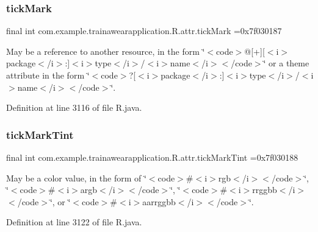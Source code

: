 \subsubsection{\texorpdfstring{tickMark}{tickMark}}
{\footnotesize\ttfamily final int com.\+example.\+trainawearapplication.\+R.\+attr.\+tick\+Mark =0x7f030187\hspace{0.3cm}{\ttfamily [static]}}

May be a reference to another resource, in the form \char`\"{}$<$code$>$@\mbox{[}+\mbox{]}\mbox{[}$<$i$>$package$<$/i$>$\+:\mbox{]}$<$i$>$type$<$/i$>$/$<$i$>$name$<$/i$>$$<$/code$>$\char`\"{} or a theme attribute in the form \char`\"{}$<$code$>$?\mbox{[}$<$i$>$package$<$/i$>$\+:\mbox{]}$<$i$>$type$<$/i$>$/$<$i$>$name$<$/i$>$$<$/code$>$\char`\"{}. 

Definition at line 3116 of file R.\+java.

\mbox{\label{classcom_1_1example_1_1trainawearapplication_1_1_r_1_1attr_a91a05f3697af6e693ff8680b084b4ada}} 
\subsubsection{\texorpdfstring{tickMarkTint}{tickMarkTint}}
{\footnotesize\ttfamily final int com.\+example.\+trainawearapplication.\+R.\+attr.\+tick\+Mark\+Tint =0x7f030188\hspace{0.3cm}{\ttfamily [static]}}

May be a color value, in the form of \char`\"{}$<$code$>$\#$<$i$>$rgb$<$/i$>$$<$/code$>$\char`\"{}, \char`\"{}$<$code$>$\#$<$i$>$argb$<$/i$>$$<$/code$>$\char`\"{}, \char`\"{}$<$code$>$\#$<$i$>$rrggbb$<$/i$>$$<$/code$>$\char`\"{}, or \char`\"{}$<$code$>$\#$<$i$>$aarrggbb$<$/i$>$$<$/code$>$\char`\"{}. 

Definition at line 3122 of file R.\+java.

\mbox{\label{classcom_1_1example_1_1trainawearapplication_1_1_r_1_1attr_a92d10ebf841217cf1f1e18424edc5f8c}} 
